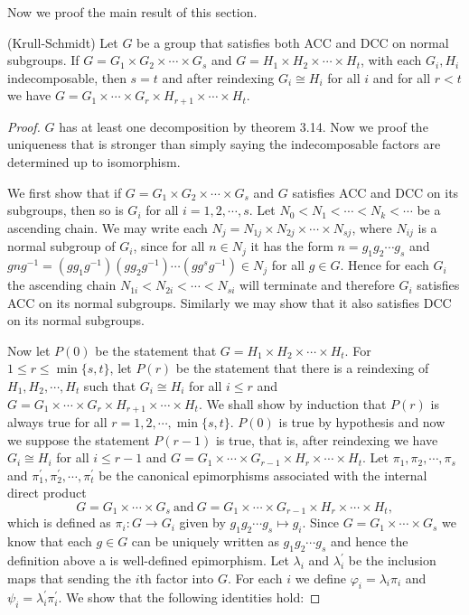 Now we proof the main result of this section.
\begin{theorem}(Krull-Schmidt)
Let $G$ be a group that satisfies both ACC and DCC on normal subgroups. If $G=G_1\times G_2\times\cdots\times G_s$ and $G=H_1\times H_2\times\cdots\times H_t$, with each $G_i,H_i$ indecomposable, then $s=t$ and after reindexing $G_i\cong H_i$ for all $i$ and for all $r<t$ we have $G=G_1\times\cdots\times G_r\times H_{r+1}\times\cdots\times H_t$.
\end{theorem}
\begin{proof}
$G$ has at least one decomposition by theorem 3.14. Now we proof the uniqueness that is stronger than simply saying the indecomposable factors are determined up to isomorphism.\par
We first show that if $G=G_1\times G_2\times\cdots\times G_s$ and $G$ satisfies ACC and DCC on its subgroups, then so is $G_i$ for all $i=1,2,\cdots,s$. Let $N_0<N_1<\cdots<N_k<\cdots$ be a ascending chain. We may write each $N_j=N_{1j}\times N_{2j}\times\cdots\times N_{sj}$, where $N_{ij}$ is a normal subgroup of $G_i$, since for all $n\in N_j$ it has the form $n=g_1g_2\cdots g_s$ and $gng^{-1}=(gg_1g^{-1})(gg_2g^{-1})\cdots(gg^{s}g^{-1})\in N_j$ for all $g\in G$. Hence for each $G_i$ the ascending chain $N_{1i}<N_{2i}<\cdots<N_{si}$ will terminate and therefore $G_i$ satisfies ACC on its normal subgroups. Similarly we may show that it also satisfies DCC on its normal subgroups.\par
Now let $P(0)$ be the statement that $G=H_1\times H_2\times\cdots\times H_t$. For $1\le r\le\min\{s,t\}$, let $P(r)$ be the statement that there is a reindexing of $H_1,H_2,\cdots,H_t$ such that $G_i\cong H_i$ for all $i\le r$ and $G=G_1\times\cdots\times G_r\times H_{r+1}\times\cdots\times H_t$. We shall show by induction that $P(r)$ is always true for all $r=1,2,\cdots,\min\{s,t\}$. $P(0)$ is true by hypothesis and now we suppose the statement $P(r-1)$ is true, that is, after reindexing we have $G_i\cong H_i$ for all $i\le r-1$ and $G=G_1\times\cdots\times G_{r-1}\times H_r\times\cdots\times H_t$. Let $\pi_1,\pi_2,\cdots,\pi_s$ and $\pi_1^\prime,\pi_2^\prime,\cdots,\pi_t^\prime$ be the canonical epimorphisms associated with the internal direct product
$$G=G_1\times\cdots\times G_s\ \text{and}\ G=G_1\times\cdots\times G_{r-1}\times H_r\times\cdots\times H_t,$$
which is defined as $\pi_i:G\to G_i$ given by $g_1g_2\cdots g_s\mapsto g_i$. Since $G=G_1\times\cdots\times G_s$ we know that each $g\in G$ can be uniquely written as $g_1g_2\cdots g_s$ and hence the definition above a is well-defined epimorphism. Let $\lambda_i$ and $\lambda_i^\prime$ be the inclusion maps that sending the $i$th factor into $G$. For each $i$ we define $\varphi_i=\lambda_i\pi_i$ and $\psi_i=\lambda_i^\prime\pi_i^\prime$. We show that the following identities hold:\par

\end{proof}
